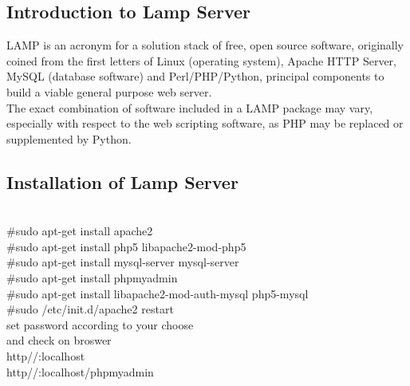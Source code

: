 \subsection{Introduction to Lamp Server}
\Lampserver LAMP is an acronym for a solution stack of free, open source software, originally coined from the first letters of Linux (operating system), Apache HTTP Server, MySQL (database software) and Perl/PHP/Python, principal components to build a viable general purpose web server.\\The exact combination of software included in a LAMP package may vary, especially with respect to the web scripting software, as PHP may be replaced or supplemented by Python.

\newpage
\subsection{Installation of Lamp Server}\\
#sudo apt-get install apache2\\

#sudo apt-get install php5 libapache2-mod-php5\\

#sudo apt-get install mysql-server mysql-server\\

#sudo apt-get install phpmyadmin\\

#sudo apt-get install libapache2-mod-auth-mysql php5-mysql\\

#sudo /etc/init.d/apache2 restart\\

set password according to your choose\\
and check on broswer\\

http//:localhost\\
http//:localhost/phpmyadmin\\


